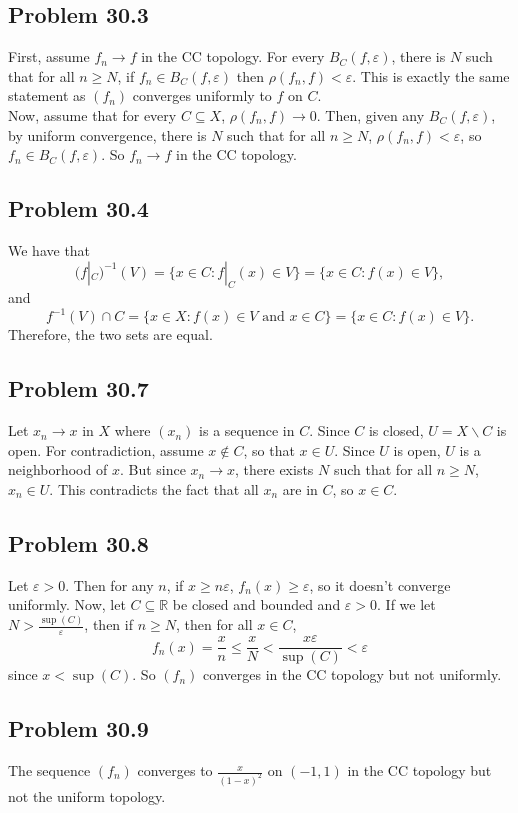 \documentclass{article}
\newcommand{\R}{\mathbb{R}}
\newcommand{\eps}{\varepsilon}
\newcommand{\minus}{\backslash}
\begin{document}
\subsection*{Problem 30.3}
First, assume $f_n \to f$ in the CC topology. For every $B_C(f, \eps)$, there is $N$ such that for all $n \ge N$, if $f_n \in B_C(f, \eps)$ then $\rho(f_n, f) < \eps$. This is exactly the same statement as $(f_n)$ converges uniformly to $f$ on $C$. \\

Now, assume that for every $C \subseteq X$, $\rho(f_n, f) \to 0$. Then, given any $B_C(f, \eps)$, by uniform convergence, there is $N$ such that for all $n \ge N$, $\rho(f_n, f) < \eps$, so $f_n \in B_C(f, \eps)$. So $f_n \to f$ in the CC topology.

\subsection*{Problem 30.4}
We have that
$$(f|_C)^{-1}(V) = \{x \in C: f|_C(x) \in V\} = \{x \in C: f(x) \in V\},$$
and
$$f^{-1}(V) \cap C = \{x \in X: f(x) \in V \text{ and }x \in C\} = \{x \in C: f(x) \in V\}.$$
Therefore, the two sets are equal.

\subsection*{Problem 30.7}
Let $x_n \to x$ in $X$ where $(x_n)$ is a sequence in $C$. Since $C$ is closed, $U = X \minus C$ is open. For contradiction, assume $x \notin C$, so that $x \in U$. Since $U$ is open, $U$ is a neighborhood of $x$. But since $x_n \to x$, there exists $N$ such that for all $n \ge N$, $x_n \in U$. This contradicts the fact that all $x_n$ are in $C$, so $x \in C$.

\subsection*{Problem 30.8}
Let $\eps > 0$. Then for any $n$, if $x \ge n\eps$, $f_n(x) \ge \eps$, so it doesn't converge uniformly. Now, let $C \subseteq \R$ be closed and bounded and $\eps > 0$. If we let $N > \frac{\sup(C)}{\eps}$, then if $n \ge N$, then for all $x \in C$,
$$f_n(x) = \frac{x}{n} \le \frac{x}{N} < \frac{x \eps}{\sup(C)} < \eps$$
since $x < \sup(C)$. So $(f_n)$ converges in the CC topology but not uniformly.

\subsection*{Problem 30.9}
The sequence $(f_n)$ converges to $\frac{x}{(1 - x)^2}$ on $(-1, 1)$ in the CC topology but not the uniform topology. \\
\end{document}
